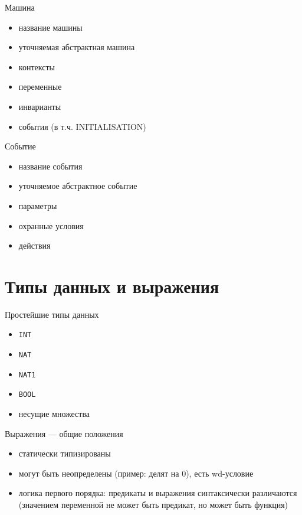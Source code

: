 \documentclass[hyperref={unicode=true}]{beamer}
\begin{document}
	\begin{frame}{Машина}
		\begin{itemize}
			\item название машины
			\item уточняемая абстрактная машина
			\item контексты
			\item переменные
			\item инварианты
			\item события (в т.ч. INITIALISATION)
		\end{itemize}
	\end{frame}

	\begin{frame}{Событие}
		\begin{itemize}
			\item название события
			\item уточняемое абстрактное событие
			\item параметры
			\item охранные условия
			\item действия
		\end{itemize}
	\end{frame}	

	\section{Типы данных и выражения}

	\begin{frame}{Простейшие типы данных}
		\begin{itemize}
			\item \texttt{INT}
			\item \texttt{NAT}
			\item \texttt{NAT1}
			\item \texttt{BOOL}
			\item несущие множества
		\end{itemize}
	\end{frame}

	\begin{frame}{Выражения --- общие положения}
		\begin{itemize}
			\item статически типизированы
			\item могут быть неопределены (пример: делят на 0),
			      есть wd-условие
			\item логика первого порядка: предикаты
			      и выражения синтаксически различаются
				  (значением переменной не может быть предикат,
				   но может быть функция)
		\end{itemize}
	\end{frame}
\end{document}

